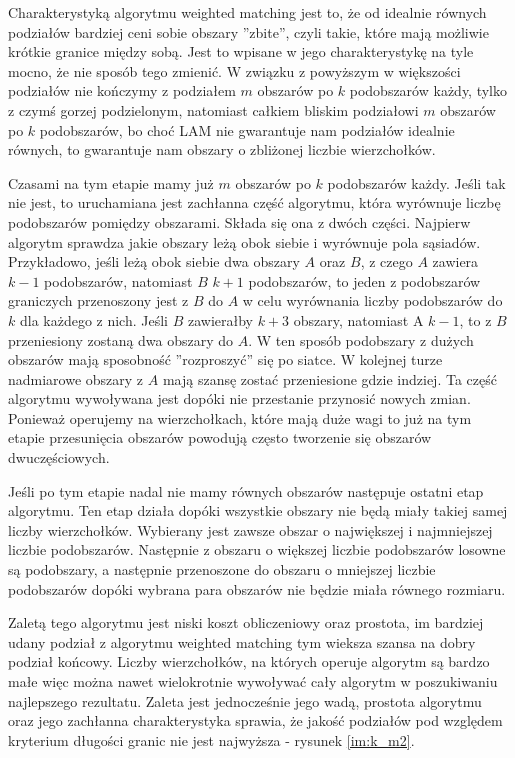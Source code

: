 Charakterystyką algorytmu weighted matching jest to, że od idealnie równych podziałów bardziej ceni sobie obszary
''zbite'', czyli takie, które mają możliwie krótkie granice między sobą.
Jest to wpisane w jego charakterystykę na tyle mocno, że nie sposób tego zmienić.
W związku z powyższym w większości podziałów nie kończymy z podziałem $m$ obszarów po $k$ podobszarów każdy, tylko z czymś gorzej
podzielonym, natomiast całkiem bliskim podziałowi $m$ obszarów po $k$ podobszarów, bo choć LAM nie gwarantuje
nam podziałów idealnie równych,
to gwarantuje nam obszary o zbliżonej liczbie wierzchołków.

Czasami na tym etapie mamy już $m$ obszarów po $k$ podobszarów każdy.
Jeśli tak nie jest, to uruchamiana jest
zachłanna część algorytmu, która wyrównuje liczbę podobszarów pomiędzy obszarami.
Składa się ona z dwóch części.
Najpierw algorytm sprawdza jakie obszary leżą obok siebie i wyrównuje pola sąsiadów.
Przykładowo, jeśli leżą obok siebie dwa obszary $A$ oraz $B$, z czego $A$ zawiera $k-1$ podobszarów, natomiast $B$ $k+1$
podobszarów, to jeden z podobszarów graniczych przenoszony jest z $B$ do $A$ w celu wyrównania liczby
podobszarów do $k$ dla każdego z nich.
Jeśli $B$ zawierałby $k+3$ obszary, natomiast A $k-1$, to z $B$ przeniesiony zostaną dwa obszary do $A$.
W ten sposób podobszary z dużych obszarów mają sposobność ''rozproszyć'' się po siatce.
W kolejnej turze nadmiarowe obszary z $A$ mają szansę zostać przeniesione gdzie indziej.
Ta część algorytmu wywoływana jest dopóki nie przestanie przynosić nowych zmian.
Ponieważ operujemy na wierzchołkach, które mają duże wagi to już na tym etapie przesunięcia obszarów powodują często
tworzenie się obszarów dwuczęściowych.

Jeśli po tym etapie nadal nie mamy równych obszarów następuje ostatni etap algorytmu.
Ten etap działa dopóki wszystkie obszary nie będą miały takiej samej liczby wierzchołków.
Wybierany jest zawsze obszar o największej i najmniejszej liczbie podobszarów.
Następnie z obszaru o większej liczbie podobszarów losowne są podobszary, a następnie przenoszone do
obszaru o mniejszej liczbie podobszarów dopóki wybrana para obszarów nie będzie miała równego rozmiaru.

Zaletą tego algorytmu jest niski koszt obliczeniowy oraz prostota, im bardziej udany podział z algorytmu
weighted matching tym wieksza szansa na dobry podział końcowy.
Liczby wierzchołków, na których operuje algorytm są bardzo małe więc można nawet wielokrotnie
wywoływać cały algorytm w poszukiwaniu najlepszego rezultatu.
Zaleta jest jednocześnie jego wadą, prostota algorytmu oraz jego zachłanna charakterystyka sprawia, że
jakość podziałów pod względem kryterium długości granic nie jest najwyższa - rysunek \ref{im:k_m2}.

